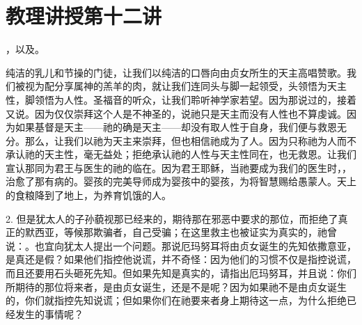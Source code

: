 

\section{教理讲授第十二讲}

\par

\par

，以及。\par

纯洁的乳儿和节操的门徒，让我们以纯洁的口唇向由贞女所生的天主高唱赞歌。我们被视为配分享属神的羔羊的肉，就让我们连同头与脚一起领受，头领悟为天主性，脚领悟为人性。圣福音的听众，让我们聆听神学家若望。因为那说过的，接着又说。因为仅仅崇拜这个人是不神圣的，说祂只是天主而没有人性也不算虔诚。因为如果基督是天主——祂的确是天主——却没有取人性于自身，我们便与救恩无分。那么，让我们以祂为天主来崇拜，但也相信祂成为了人。因为只称祂为人而不承认祂的天主性，毫无益处；拒绝承认祂的人性与天主性同在，也无救恩。让我们宣认那同为君王与医生的祂的临在。因为君王耶稣，当祂要成为我们的医生时，，治愈了那有病的。婴孩的完美导师成为婴孩中的婴孩，为将智慧赐给愚蒙人。天上的食粮降到了地上，为养育饥饿的人。\par

2. 但是犹太人的子孙藐视那已经来的，期待那在邪恶中要求的那位，而拒绝了真正的默西亚，等候那欺骗者，自己受骗；在这里救主也被证实为真实的，祂曾说：。也宜向犹太人提出一个问题。那说厄玛努耳将由贞女诞生的先知依撒意亚，是真还是假？如果他们指控他说谎，并不奇怪：因为他们的习惯不仅是指控说谎，而且还要用石头砸死先知。但如果先知是真实的，请指出厄玛努耳，并且说：你们所期待的那位将来者，是由贞女诞生，还是不是呢？因为如果祂不是由贞女诞生的，你们就指控先知说谎；但如果你们在祂要来者身上期待这一点，为什么拒绝已经发生的事情呢？\par

